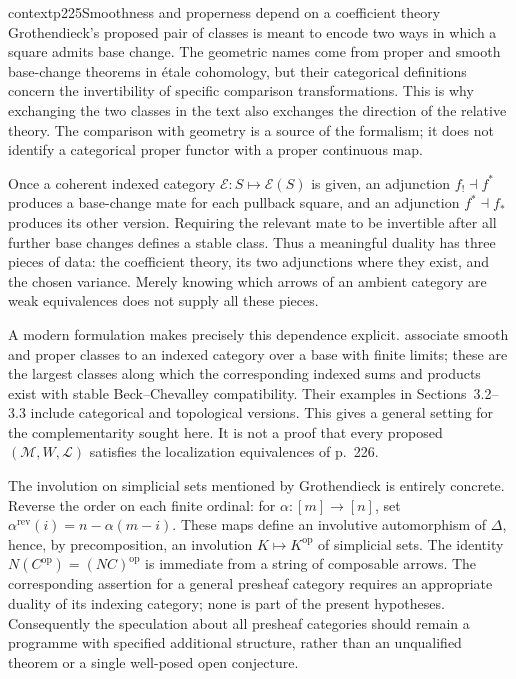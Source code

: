 \begin{dcomment}{context}{p225}{Smoothness and properness depend on a coefficient theory}
Grothendieck's proposed pair of classes is meant to encode two ways in which a square admits base change. The geometric names come from proper and smooth base-change theorems in étale cohomology, but their categorical definitions concern the invertibility of specific comparison transformations. This is why exchanging the two classes in the text also exchanges the direction of the relative theory. The comparison with geometry is a source of the formalism; it does not identify a categorical proper functor with a proper continuous map.

Once a coherent indexed category $\mathscr E:S\mapsto\mathscr E(S)$ is given, an adjunction $f_!\dashv f^*$ produces a base-change mate for each pullback square, and an adjunction $f^*\dashv f_*$ produces its other version. Requiring the relevant mate to be invertible after all further base changes defines a stable class. Thus a meaningful duality has three pieces of data: the coefficient theory, its two adjunctions where they exist, and the chosen variance. Merely knowing which arrows of an ambient category are weak equivalences does not supply all these pieces.

A modern formulation makes precisely this dependence explicit. \citet[Definition 9 and Proposition 10]{AnelWeinberger2024} associate smooth and proper classes to an indexed category over a base with finite limits; these are the largest classes along which the corresponding indexed sums and products exist with stable Beck--Chevalley compatibility. Their examples in Sections~3.2--3.3 include categorical and topological versions. This gives a general setting for the complementarity sought here. It is not a proof that every proposed $(\mathcal M,W,\mathcal L)$ satisfies the localization equivalences of p.~226.

The involution on simplicial sets mentioned by Grothendieck is entirely concrete. Reverse the order on each finite ordinal: for $\alpha:[m]\to[n]$, set $\alpha^{\mathrm{rev}}(i)=n-\alpha(m-i)$. These maps define an involutive automorphism of $\Delta$, hence, by precomposition, an involution $K\mapsto K^{\mathrm{op}}$ of simplicial sets. The identity $N(C^{\mathrm{op}})=(NC)^{\mathrm{op}}$ is immediate from a string of composable arrows. The corresponding assertion for a general presheaf category requires an appropriate duality of its indexing category; none is part of the present hypotheses. Consequently the speculation about all presheaf categories should remain a programme with specified additional structure, rather than an unqualified theorem or a single well-posed open conjecture.
\end{dcomment}

